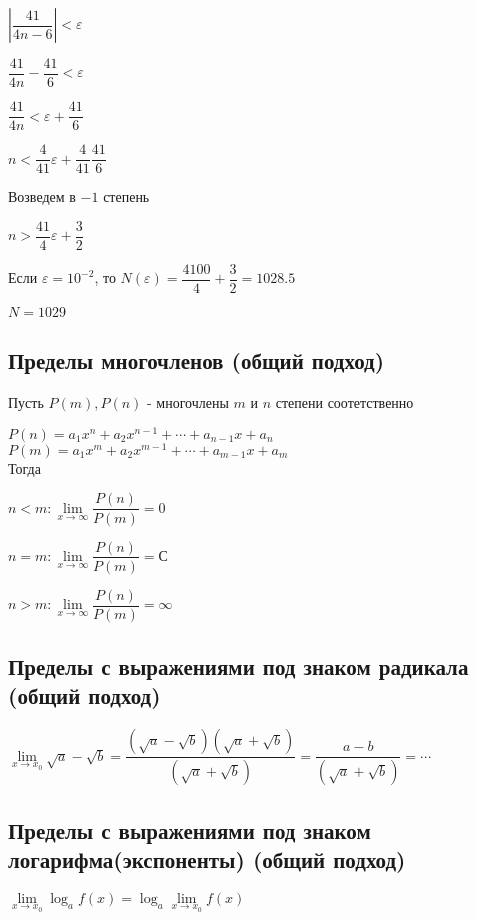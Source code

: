 $ \left|  \dfrac{41}{4n - 6} \right| < \varepsilon $

$ \dfrac{41}{4n} - \dfrac{41}{6}  < \varepsilon $

$ \dfrac{41}{4n} < \varepsilon + \dfrac{41}{6}$

$ n < \dfrac{4}{41}\varepsilon + \dfrac{4}{41}\dfrac{41}{6}$

Возведем в $ -1 $ степень

$ n > \dfrac{41}{4}\varepsilon + \dfrac{3}{2}$

Если $ \varepsilon = 10^{-2} $, то $ N(\varepsilon) = \dfrac{4100}{4} + \dfrac{3}{2} = 1028.5 $

$ N = 1029 $

\subsection{Пределы многочленов (общий подход)}

Пусть $ P(m), P(n) $ - многочлены $ m $ и $ n $ степени соотетственно

$P(n)=a_1 x^n + a_2 x^{n-1} + \cdots + a_{n-1}x +  a_{n}$ \\

$P(m)=a_1 x^m + a_2 x^{m-1} + \cdots + a_{m-1}x +  a_{m}$ \\

Тогда

$n < m: \lim\limits_{x\to \infty} \dfrac{P(n)}{P(m)} = 0 $

$n = m: \lim\limits_{x\to \infty} \dfrac{P(n)}{P(m)} = С $

$n > m: \lim\limits_{x\to \infty} \dfrac{P(n)}{P(m)} = \infty $

\subsection{Пределы с выражениями под знаком радикала (общий подход)}

$\lim\limits_{x\to x_0} \sqrt{a} - \sqrt{b} = 
\dfrac{(\sqrt{a} - \sqrt{b})(\sqrt{a} + \sqrt{b})}{(\sqrt{a} + \sqrt{b})} =
\dfrac{a - b}{(\sqrt{a} + \sqrt{b})}  = \cdots $

\subsection{Пределы с выражениями под знаком логарифма(экспоненты) (общий подход)}

$ \lim\limits_{x\to x_0} \log_a{f(x)} =  \log_a {\lim\limits_{x\to x_0} {f(x)} }  $

